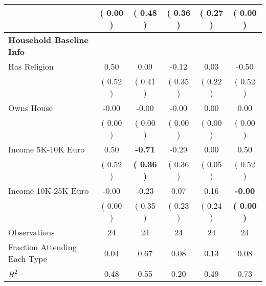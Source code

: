 \begin{table}[H]
{\begin{tabular}{lccccc}
\quad  & (     0.00 ) & (     0.48 )  & (     0.36 )  & (     0.27 ) & (     0.00 ) \\
\midrule
\textbf{Household Baseline Info} \\
\quad Has Religion &      0.50 &      0.09 &     -0.12 &      0.03 &     -0.50 \\
\quad  & (     0.52 ) & (     0.41 )  & (     0.35 )  & (     0.22 ) & (     0.52 ) \\
\quad Owns House &     -0.00 &     -0.00 &     -0.00 &      0.00 &      0.00 \\
\quad  & (     0.00 ) & (     0.00 )  & (     0.00 )  & (     0.00 ) & (     0.00 ) \\
\quad Income 5K-10K Euro &      0.50 & \textbf{    -0.71} &     -0.29 &      0.00 &      0.50 \\
\quad  & (     0.52 ) & \textbf{(     0.36 )}  & (     0.36 )  & (     0.05 ) & (     0.52 ) \\
\quad Income 10K-25K Euro &     -0.00 &     -0.23 &      0.07 &      0.16 & \textbf{    -0.00} \\
\quad  & (     0.00 ) & (     0.35 )  & (     0.23 )  & (     0.24 ) & \textbf{(     0.00 )} \\
\midrule
Observations & 24 & 24 & 24 & 24 & 24 \\
Fraction Attending Each Type &      0.04 &      0.67 &      0.08 &      0.13 &      0.08 \\
\midrule
$ R^2$ &      0.48 &      0.55 &      0.20 &      0.49 &      0.73 \\
\bottomrule
\end{tabular}}
\end{table}
